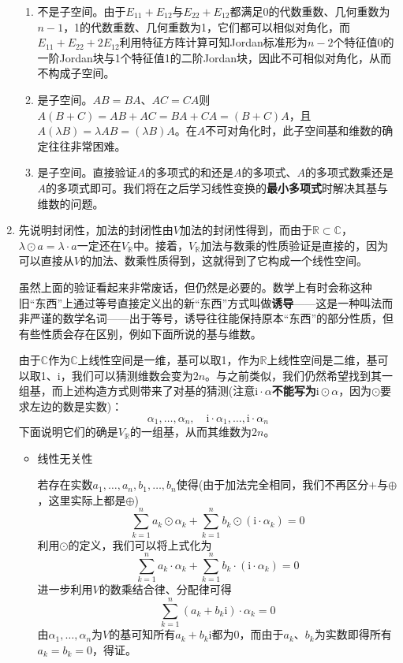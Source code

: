\documentclass[a4paper,UTF8,fontset=windows,AutoFakeBold]{ctexart}
\newcommand*{\ir}{\mathrm{i}}
\newcommand*{\note}{\noindent *}
\begin{document}
\begin{enumerate}
\begin{enumerate}
        \item 不是子空间。由于$E_{11}+E_{12}$与$E_{22}+E_{12}$都满足0的代数重数、几何重数为$n-1$，1的代数重数、几何重数为1，它们都可以相似对角化，而$E_{11}+E_{22}+2E_{12}$利用特征方阵计算可知Jordan标准形为$n-2$个特征值0的一阶Jordan块与1个特征值1的二阶Jordan块，因此不可相似对角化，从而不构成子空间。
        \item 是子空间。$AB=BA$、$AC=CA$则$A(B+C)=AB+AC=BA+CA=(B+C)A$，且$A(\lambda B)=\lambda AB=(\lambda B)A$。在$A$不可对角化时，此子空间基和维数的确定往往非常困难。
        \item 是子空间。直接验证$A$的多项式的和还是$A$的多项式、$A$的多项式数乘还是$A$的多项式即可。我们将在之后学习线性变换的\textbf{最小多项式}时解决其基与维数的问题。
    \end{enumerate}

    \item 先说明封闭性，加法的封闭性由$V$加法的封闭性得到，而由于$\mathbb{R}\subset\mathbb{C}$，$\lambda\odot a=\lambda\cdot a$一定还在$V_\mathbb{R}$中。接着，$V_\mathbb{R}$加法与数乘的性质验证是直接的，因为可以直接从$V$的加法、数乘性质得到，这就得到了它构成一个线性空间。
    
    \note 虽然上面的验证看起来非常废话，但仍然是必要的。数学上有时会称这种旧``东西''上通过等号直接定义出的新``东西''方式叫做\textbf{诱导}——这是一种叫法而非严谨的数学名词——出于等号，诱导往往能保持原本``东西''的部分性质，但有些性质会存在区别，例如下面所说的基与维数。

    由于$\mathbb{C}$作为$\mathbb{C}$上线性空间是一维，基可以取1，作为$\mathbb{R}$上线性空间是二维，基可以取1、$\ir$，我们可以猜测维数会变为$2n$。与之前类似，我们仍然希望找到其一组基，而上述构造方式则带来了对基的猜测(注意$\ir\cdot\alpha$\textbf{不能写为}$\ir\odot\alpha$，因为$\odot$要求左边的数是实数)：
    $$\alpha_1,\dots,\alpha_n,\quad\ir\cdot\alpha_1,\dots,\ir\cdot\alpha_n$$
    下面说明它们的确是$V_\mathbb{R}$的一组基，从而其维数为$2n$。
    \begin{itemize}
        \item 线性无关性
        
        若存在实数$a_1,\dots,a_n,b_1,\dots,b_n$使得(由于加法完全相同，我们不再区分$+$与$\oplus$，这里实际上都是$\oplus$)
        $$\sum_{k=1}^na_k\odot\alpha_k+\sum_{k=1}^nb_k\odot(\ir\cdot\alpha_k)=0$$
        利用$\odot$的定义，我们可以将上式化为
        $$\sum_{k=1}^na_k\cdot\alpha_k+\sum_{k=1}^nb_k\cdot(\ir\cdot\alpha_k)=0$$
        进一步利用$V$的数乘结合律、分配律可得
        $$\sum_{k=1}^n(a_k+b_k\ir)\cdot\alpha_k=0$$
        由$\alpha_1,\dots,\alpha_n$为$V$的基可知所有$a_k+b_k\ir$都为0，而由于$a_k$、$b_k$为实数即得所有$a_k=b_k=0$，得证。


\end{itemize}
\end{enumerate}
\end{document}
